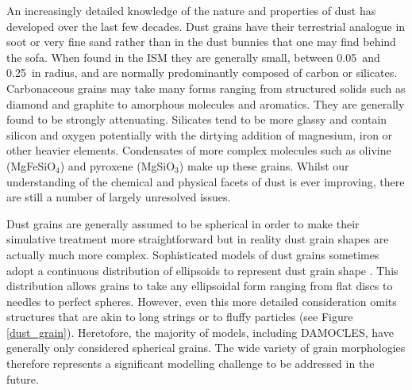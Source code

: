 An increasingly detailed knowledge of the nature and properties of dust has developed over the last few decades. Dust grains have their terrestrial analogue in soot or very fine sand rather than in the dust bunnies that one may find behind the sofa.  When found in the ISM they are generally small, between 0.05\micron\ and 0.25\micron\ in radius, and are normally predominantly composed of carbon or silicates.  Carbonaceous grains may take many forms ranging from structured solids such as diamond and graphite to amorphous molecules and aromatics.  They are generally found to be strongly attenuating.  Silicates tend to be more glassy and contain silicon and oxygen potentially with the dirtying addition of magnesium, iron or other heavier elements.  Condensates of more complex molecules such as olivine (MgFeSiO$_4$) and pyroxene (MgSiO$_3$) make up these grains.  Whilst our understanding of the chemical and physical facets of dust is ever improving, there are still a number of largely unresolved issues.  %

Dust grains are generally assumed to be spherical in order to make their simulative treatment more straightforward but in reality dust grain shapes are actually much more complex.  Sophisticated models of dust grains sometimes adopt a continuous distribution of ellipsoids to represent dust grain shape \citep{Bohren1983}.  This distribution allows grains to take any ellipsoidal form ranging from flat discs to needles to perfect spheres.  However, even this more detailed consideration omits structures that are akin to long strings or to fluffy particles (see Figure \ref{dust_grain}). Heretofore, the  majority of models, including DAMOCLES, have generally only considered spherical grains.  The wide variety of grain morphologies therefore represents a significant modelling challenge to be addressed in the future.



